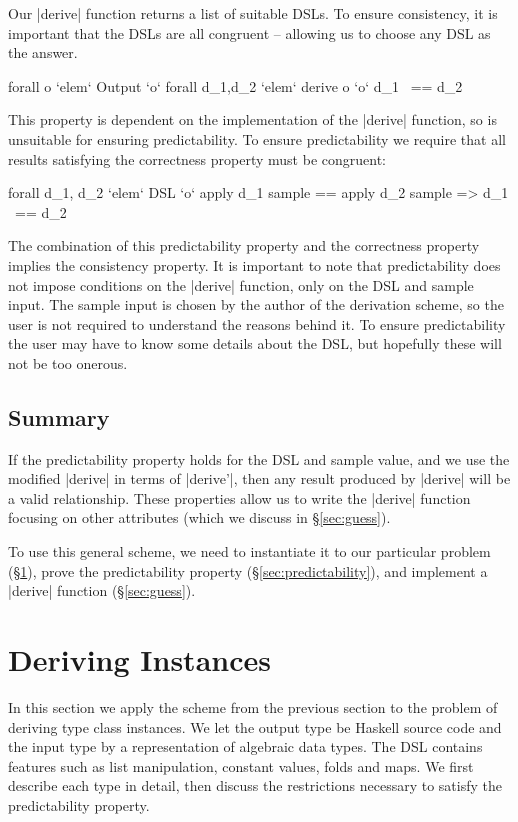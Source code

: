 \documentclass[preprint,draft]{sigplanconf}
\begin{document}
Our |derive| function returns a list of suitable DSLs. To ensure consistency, it is important that the DSLs are all congruent -- allowing us to choose any DSL as the answer.

\ignore\begin{code}
forall o `elem` Output `o` forall d_1,d_2 `elem` derive o `o` d_1 ~== d_2
\end{code}

This property is dependent on the implementation of the |derive| function, so is unsuitable for ensuring predictability. To ensure predictability we require that all results satisfying the correctness property must be congruent:

\ignore\begin{code}
forall d_1, d_2 `elem` DSL `o`
    apply d_1 sample == apply d_2 sample => d_1 ~== d_2
\end{code}

The combination of this predictability property and the correctness property implies the consistency property. It is important to note that predictability does not impose conditions on the |derive| function, only on the DSL and sample input. The sample input is chosen by the author of the derivation scheme, so the user is not required to understand the reasons behind it. To ensure predictability the user may have to know some details about the DSL, but hopefully these will not be too onerous.

\subsection{Summary}

If the predictability property holds for the DSL and sample value, and we use the modified |derive| in terms of |derive'|, then any result produced by |derive| will be a valid relationship. These properties allow us to write the |derive| function focusing on other attributes (which we discuss in \S\ref{sec:guess}).

To use this general scheme, we need to instantiate it to our particular problem (\S\ref{sec:instances}), prove the predictability property (\S\ref{sec:predictability}), and implement a |derive| function (\S\ref{sec:guess}).

\section{Deriving Instances}
\label{sec:instances}

In this section we apply the scheme from the previous section to the problem of deriving type class instances. We let the output type be Haskell source code and the input type by a representation of algebraic data types. The DSL contains features such as list manipulation, constant values, folds and maps. We first describe each type in detail, then discuss the restrictions necessary to satisfy the predictability property.
\end{document}
